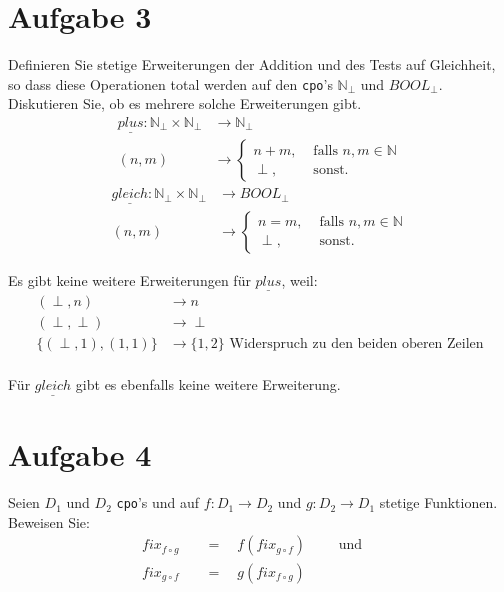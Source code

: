 \documentclass[ngerman,a4paper]{report}
\begin{document}
\section*{Aufgabe 3}
Definieren Sie stetige Erweiterungen der Addition und des Tests auf Gleichheit, so dass diese Operationen total werden auf den \lstinline!cpo!'s $\mathbb{N}_\bot$ und $BOOL_\bot$. Diskutieren Sie, ob es mehrere solche Erweiterungen gibt.\\
\begin{align*}
\underline{plus} : \mathbb{N}_\perp \times \mathbb{N}_\perp &\rightarrow \mathbb{N}_\perp\\
(n,m) &\rightarrow \begin{cases}
n+m, &\text{ falls } n,m \in \mathbb{N}\\
\perp , &\text{ sonst.}
\end{cases}
\end{align*}
\begin{align*}
\underline{gleich} : \mathbb{N}_\perp \times \mathbb{N}_\perp &\rightarrow BOOL_\perp\\
(n,m) &\rightarrow \begin{cases}
n=m, &\text{ falls } n,m \in \mathbb{N}\\
\perp , &\text{ sonst.}
\end{cases}
\end{align*}

Es gibt keine weitere Erweiterungen für $\underline{plus}$, weil:
\begin{align*}
(\perp, n) & \rightarrow n \\
(\perp, \perp) & \rightarrow \perp \\
\{(\perp, 1),(1,1) \} &\rightarrow \{1,2\} \text{ Widerspruch zu den beiden oberen Zeilen}\\
\end{align*}

Für $\underline{gleich}$ gibt es ebenfalls keine weitere Erweiterung.\\
\section*{Aufgabe 4}
Seien $D_1$ und $D_2$ \lstinline!cpo!'s und auf $f:D_1\rightarrow D_2$ und $g:D_2 \rightarrow D_1$ stetige Funktionen.\\
Beweisen Sie:\\
\begin{align*}
	fix_{f\circ g}\quad &= \quad f(fix_{g \circ f}) \quad\quad \text{ und }\\
	fix_{g\circ f}\quad &= \quad g(fix_{f\circ g}) &\\
\end{align*}
\end{document}

